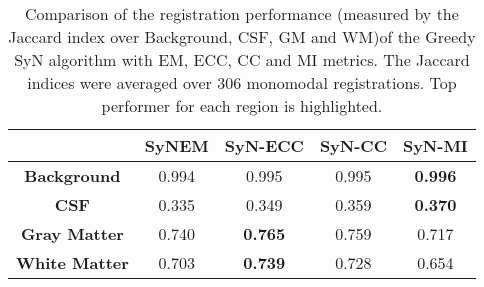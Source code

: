 \begin{table}[htbp]
  \centering
  {\small
    \begin{tabular}{ccccc}
    \toprule
    \textbf{} & \textbf{SyNEM} & \textbf{SyN-ECC} & \textbf{SyN-CC} & \multicolumn{1}{c}{\textbf{SyN-MI}} \\
    \midrule
    \textbf{Background} & 0.994 & 0.995 & 0.995 & \textbf{0.996} \\
    \textbf{CSF} & 0.335 & 0.349 & 0.359 & \textbf{0.370} \\
    \textbf{Gray Matter} & 0.740 & \textbf{0.765} & 0.759 & 0.717 \\
    \textbf{White Matter} & 0.703 & \textbf{0.739} & 0.728 & 0.654 \\
    \bottomrule
    \end{tabular}%
    \caption{Comparison of the registration performance (measured by the Jaccard index over Background, CSF, GM and WM)of the Greedy SyN algorithm with EM, ECC, CC and MI metrics.
The Jaccard indices were averaged over 306 monomodal registrations. Top performer for each region is highlighted.}
  \label{tab:monomodal_results_segTri_fill}}%
\end{table}%
